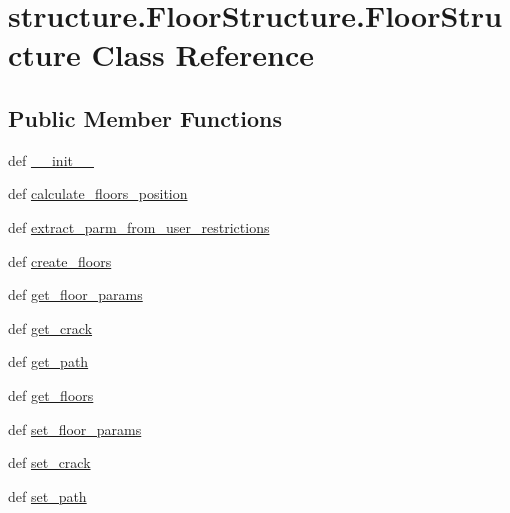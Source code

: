 \hypertarget{classstructure_1_1_floor_structure_1_1_floor_structure}{\section{structure.\-Floor\-Structure.\-Floor\-Structure Class Reference}
\label{classstructure_1_1_floor_structure_1_1_floor_structure}
}
\subsection*{Public Member Functions}
\begin{DoxyCompactItemize}
\item 
def \hyperlink{classstructure_1_1_floor_structure_1_1_floor_structure_a57b24f0019092e151a006682f465398d}{\-\_\-\-\_\-init\-\_\-\-\_\-}
\item 
def \hyperlink{classstructure_1_1_floor_structure_1_1_floor_structure_affc20027f2245864c9bbf6a900c55768}{calculate\-\_\-floors\-\_\-position}
\item 
def \hyperlink{classstructure_1_1_floor_structure_1_1_floor_structure_a37403c5f002d24e8684eb4055c588da7}{extract\-\_\-parm\-\_\-from\-\_\-user\-\_\-restrictions}
\item 
def \hyperlink{classstructure_1_1_floor_structure_1_1_floor_structure_a2ac768909515faa0d42825d925b7aac9}{create\-\_\-floors}
\item 
def \hyperlink{classstructure_1_1_floor_structure_1_1_floor_structure_a95c0ba0907abd78a175538439cd1396d}{get\-\_\-floor\-\_\-params}
\item 
def \hyperlink{classstructure_1_1_floor_structure_1_1_floor_structure_a743981d4bf4bbbb3ee843d8c10b5348c}{get\-\_\-crack}
\item 
def \hyperlink{classstructure_1_1_floor_structure_1_1_floor_structure_af59ef9ce972ef2e0d50419c5adda4e1a}{get\-\_\-path}
\item 
def \hyperlink{classstructure_1_1_floor_structure_1_1_floor_structure_a9f97ead83a9a2d4d575d9cdb63aec030}{get\-\_\-floors}
\item 
def \hyperlink{classstructure_1_1_floor_structure_1_1_floor_structure_afa9ea49e87f36052f3c823761d0baacc}{set\-\_\-floor\-\_\-params}
\item 
def \hyperlink{classstructure_1_1_floor_structure_1_1_floor_structure_a37cd2c89db8f43af4a13b36abcd39c5a}{set\-\_\-crack}
\item 
def \hyperlink{classstructure_1_1_floor_structure_1_1_floor_structure_a1217d2638f5a3210f8d8f2a4d8ba62dd}{set\-\_\-path}

\end{DoxyCompactItemize}
